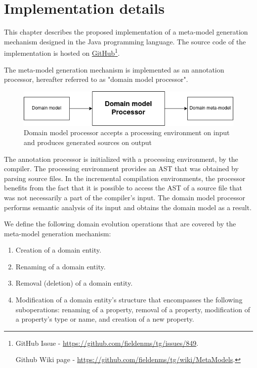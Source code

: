 \chapter{Implementation details}\label{chap:imp}
This chapter describes the proposed implementation of a meta-model generation mechanism designed in the Java programming language. The source code of the implementation is hosted on \href{https://github.com/fieldenms/tg/blob/Issue-\%23849/platform-annotation-processors/src/main/java/ua/com/fielden/platform/processors/metamodel/MetaModelProcessor.java}{GitHub}\footnote{GitHub Issue - \url{https://github.com/fieldenms/tg/issues/849}.

\; \;Github Wiki page - \url{https://github.com/fieldenms/tg/wiki/MetaModels}.}.

\n

The meta-model generation mechanism is implemented as an annotation processor, hereafter referred to as "domain model processor".

\begin{figure}[H]\centering
    \includegraphics[scale=0.65]{images/implement1.drawio.png}
    \caption[Input and output of the domain model processor]{Domain model processor accepts a processing environment on input and produces generated sources on output}\label{fig:implement1}
\end{figure}

The annotation processor is initialized with a processing environment, by the compiler.
The processing environment provides an AST that was obtained by parsing source files.
In the incremental compilation environments, the processor benefits from the fact that it is possible to access the AST of a source file that was not necessarily a part of the compiler’s input.
The domain model processor performs semantic analysis of its input and obtains the domain model as a result.

\n

We define the following domain evolution operations that are covered by the meta-model generation mechanism:
\begin{enumerate}
    \item Creation of a domain entity.
    \item Renaming of a domain entity.
    \item Removal (deletion) of a domain entity.
    \item Modification of a domain entity's structure that encompasses the following suboperations: renaming of a property, removal of a property, modification of a property's type or name, and creation of a new property.
\end{enumerate}

